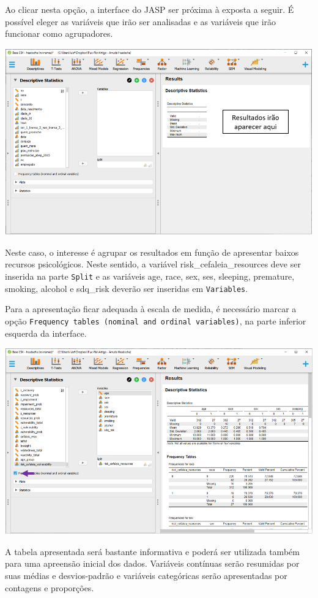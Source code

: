 \documentclass[
]{book}
\begin{document}
Ao clicar nesta opção, a interface do JASP ser próxima à exposta a seguir. É possível eleger as variáveis que irão ser analisadas e as variáveis que irão funcionar como agrupadores.

\includegraphics{./img/cap_logistica_descriptives.png}

Neste caso, o interesse é agrupar os resultados em função de apresentar baixos recursos psicológicos. Neste sentido, a variável risk\_cefaleia\_resources deve ser inserida na parte \texttt{Split} e as variáveis age, race, sex, ses, sleeping, premature, smoking, alcohol e sdq\_risk deverão ser inseridas em \texttt{Variables}.

Para a apresentação ficar adequada à escala de medida, é necessário marcar a opção \texttt{Frequency\ tables\ (nominal\ and\ ordinal\ variables)}, na parte inferior esquerda da interface.

\includegraphics{./img/cap_logistica_descriptives2.png}

A tabela apresentada será bastante informativa e poderá ser utilizada também para uma apreensão inicial dos dados. Variáveis contínuas serão resumidas por suas médias e desvios-padrão e variáveis categóricas serão apresentadas por contagens e proporções.
\end{document}
